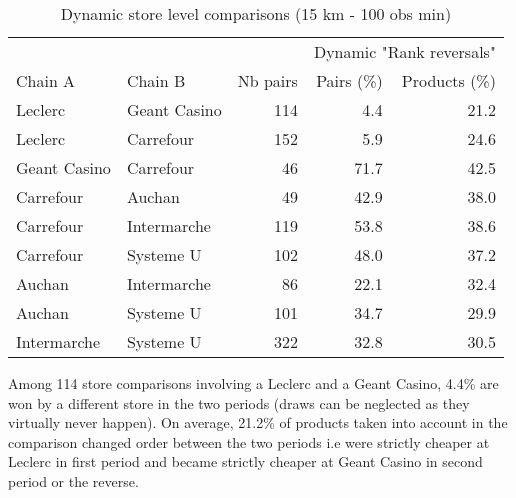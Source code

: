 \documentclass[english]{article}
\begin{document}
\begin{table}[H]
\begin{threeparttable}
\renewcommand{\arraystretch}{0.7}%
\caption{Dynamic store level comparisons (15 km - 100 obs min)
}\label{tab:dynamic_compa_15km}
\small
\begin{tabular}{llrrr}
\toprule
\toprule
    \textbf{} &       &       & \multicolumn{2}{c}{Dynamic "Rank reversals"} \\
    Chain A & Chain B & Nb pairs & Pairs (\%) & Products (\%) \\
\midrule
    Leclerc & Geant Casino & 114   & 4.4   & 21.2 \\
    Leclerc & Carrefour & 152   & 5.9   & 24.6 \\
    Geant Casino & Carrefour & 46    & 71.7  & 42.5 \\
    Carrefour & Auchan & 49    & 42.9  & 38.0 \\
    Carrefour & Intermarche & 119   & 53.8  & 38.6 \\
    Carrefour & Systeme U & 102   & 48.0  & 37.2 \\
    Auchan & Intermarche & 86    & 22.1  & 32.4 \\
    Auchan & Systeme U & 101   & 34.7  & 29.9 \\
    Intermarche & Systeme U & 322   & 32.8  & 30.5 \\
\bottomrule
\bottomrule
\end{tabular}
\begin{tablenotes}
      \small
      \item Among 114 store comparisons involving a Leclerc and a Geant Casino, 4.4\% are won by a different store in the two periods (draws can be neglected as they virtually never happen). On average, 21.2\% of products taken into account in the comparison changed order between the two periods i.e were strictly cheaper at Leclerc in first period and became strictly cheaper at Geant Casino in second period or the reverse.
\end{tablenotes}
\end{threeparttable}
\end{table}
\end{document}

